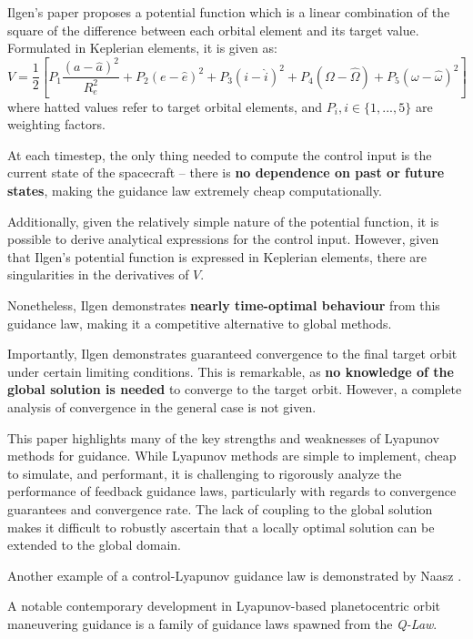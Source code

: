 Ilgen's paper proposes a potential function which is a linear combination of the square of the difference between each orbital element and its target value. Formulated in Keplerian elements, it is given as:
\begin{equation}
  V = \frac{1}{2} \left[P_1 \frac{(a - \hat{a})^2}{R_e^2} + P_2 (e - \hat{e})^2 + P_3 (i - \hat{i})^2 + P_4 (\Omega - \hat{\Omega}) + P_5 (\omega - \hat{\omega})^2  \right]
  \label{eq:ilgen_potential}
\end{equation}
where hatted values refer to target orbital elements, and $P_i, i \in \{1, ..., 5\}$ are weighting factors.

At each timestep, the only thing needed to compute the control input is the current state of the spacecraft -- there is \textbf{no dependence on past or future states}, making the guidance law extremely cheap computationally.

Additionally, given the relatively simple nature of the potential function, it is possible to derive analytical expressions for the control input. However, given that Ilgen's potential function is expressed in Keplerian elements, there are singularities in the derivatives of $V$.

Nonetheless, Ilgen demonstrates \textbf{nearly time-optimal behaviour} from this guidance law, making it a competitive alternative to global methods.

Importantly, Ilgen demonstrates guaranteed convergence to the final target orbit under certain limiting conditions. This is remarkable, as \textbf{no knowledge of the global solution is needed} to converge to the target orbit. However, a complete analysis of convergence in the general case is not given.

This paper highlights many of the key strengths and weaknesses of Lyapunov methods for guidance. While Lyapunov methods are simple to implement, cheap to simulate, and performant, it is challenging to rigorously analyze the performance of feedback guidance laws, particularly with regards to convergence guarantees and convergence rate. The lack of coupling to the global solution makes it difficult to robustly ascertain that a locally optimal solution can be extended to the global domain.

Another example of a control-Lyapunov guidance law is demonstrated by Naasz \cite{naasz2002classical}.

A notable contemporary development in Lyapunov-based planetocentric orbit maneuvering guidance is a family of guidance laws spawned from the \textit{Q-Law}.

